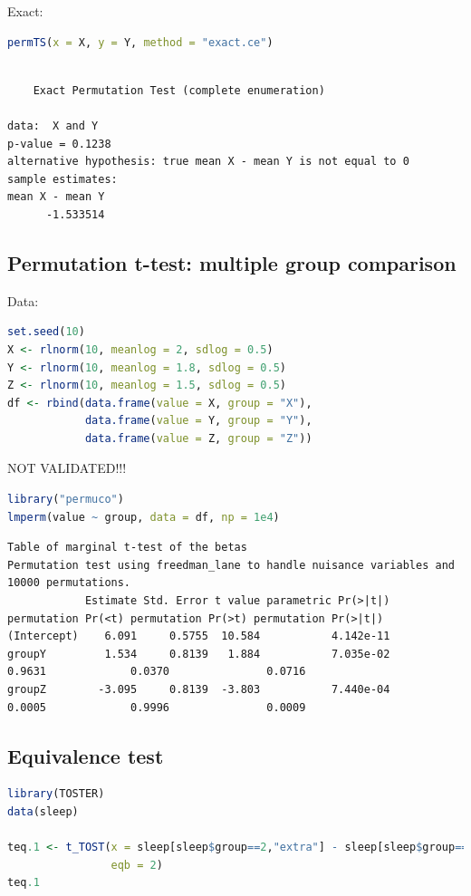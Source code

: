 \documentclass{article}
\begin{document}
Exact:
\begin{lstlisting}[language=r,numbers=none]
permTS(x = X, y = Y, method = "exact.ce")
\end{lstlisting}

\label{}
\begin{verbatim}

	Exact Permutation Test (complete enumeration)

data:  X and Y
p-value = 0.1238
alternative hypothesis: true mean X - mean Y is not equal to 0
sample estimates:
mean X - mean Y 
      -1.533514
\end{verbatim}
\subsection{Permutation t-test: multiple group comparison}
\label{sec:orgc44c5db}

Data:
\begin{lstlisting}[language=r,numbers=none]
set.seed(10)
X <- rlnorm(10, meanlog = 2, sdlog = 0.5)
Y <- rlnorm(10, meanlog = 1.8, sdlog = 0.5)
Z <- rlnorm(10, meanlog = 1.5, sdlog = 0.5)
df <- rbind(data.frame(value = X, group = "X"),
            data.frame(value = Y, group = "Y"),
            data.frame(value = Z, group = "Z"))
\end{lstlisting}

NOT VALIDATED!!! 
\begin{lstlisting}[language=r,numbers=none]
library("permuco")
lmperm(value ~ group, data = df, np = 1e4)
\end{lstlisting}

\label{}
\begin{verbatim}
Table of marginal t-test of the betas
Permutation test using freedman_lane to handle nuisance variables and 10000 permutations.
            Estimate Std. Error t value parametric Pr(>|t|) permutation Pr(<t) permutation Pr(>t) permutation Pr(>|t|)
(Intercept)    6.091     0.5755  10.584           4.142e-11                                                           
groupY         1.534     0.8139   1.884           7.035e-02             0.9631             0.0370               0.0716
groupZ        -3.095     0.8139  -3.803           7.440e-04             0.0005             0.9996               0.0009
\end{verbatim}
\subsection{Equivalence test}
\label{sec:orgd1b9069}
\begin{lstlisting}[language=r,numbers=none]
library(TOSTER)
data(sleep)

teq.1 <- t_TOST(x = sleep[sleep$group==2,"extra"] - sleep[sleep$group==1,"extra"],
                eqb = 2)           
teq.1
\end{lstlisting}
\end{document}
